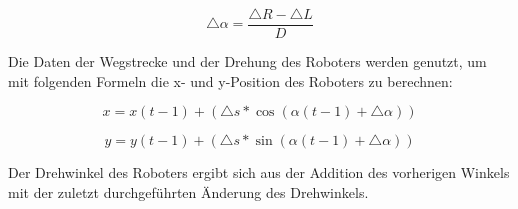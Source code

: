 \begin{equation}
\triangle \alpha = \dfrac{\triangle R - \triangle L}{D}
\end{equation} 

Die Daten der Wegstrecke und der Drehung des Roboters werden genutzt, um mit folgenden Formeln die x- und y-Position des Roboters zu berechnen:

\begin{equation}
x = x(t-1) + (\triangle s * \cos (\alpha (t-1) + \triangle \alpha))
\end{equation} 

\begin{equation}
y = y(t-1) + (\triangle s * \sin (\alpha (t-1) + \triangle \alpha))
\end{equation} 

Der Drehwinkel des Roboters ergibt sich aus der Addition des vorherigen Winkels mit der zuletzt durchgeführten Änderung des Drehwinkels.



